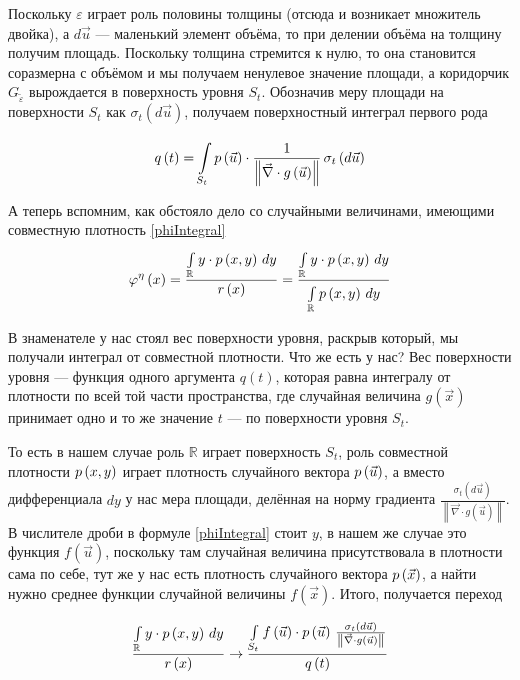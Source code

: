 Поскольку $\varepsilon$ играет роль половины толщины
(отсюда и возникает множитель двойка),
а $d\vec{u}$ --- маленький элемент объёма,
то при делении объёма на толщину получим площадь.
Поскольку толщина стремится к нулю,
то она становится соразмерна с объёмом и мы получаем ненулевое значение площади,
а коридорчик $G_{\tilde{\varepsilon}}$ вырождается в поверхность уровня $S_t$.
Обозначив меру площади на поверхности $S_t$ как
$\sigma_{t}\left( d\vec{u} \right)$,
получаем поверхностный интеграл первого рода

\begin{equation}\label{formula:conditionDencity}
  q\left( t \right)
  = \integrall{S_t}{\sigma_{t}\left(d\vec{u} \right)}{
      \pdf{\vec{u}} \cdot \frac{1}
      {\left\| \vec{\nabla} \cdot g\left( \vec{u} \right) \right\|}}
\end{equation}

А теперь вспомним, как обстояло дело со случайными величинами,
имеющими совместную плотность \eqref{phiIntegral}
$$\varphi^{\eta}\left( x \right)
  = \frac{\integral{\mathbb{R}}{}{y}{y \cdot \pdf{x,y}}}
      {r\left( x \right)}
  = \frac{\integral{\mathbb{R}}{}{y}{y \cdot \pdf{x,y}}}
      {\integral{\mathbb{R}}{}{y}{\pdf{x,y}}}$$

В знаменателе у нас стоял вес поверхности уровня,
раскрыв который, мы получали интеграл от совместной плотности.
Что же есть у нас?
Вес поверхности уровня --- функция одного аргумента $q\left( t \right)$,
которая равна интегралу от плотности по всей той части пространства,
где случайная величина $g\left( \vec{x} \right)$
принимает одно и то же значение $t$ --- по поверхности уровня $S_t$.

То есть в нашем случае роль $\mathbb{R}$ играет поверхность $S_t$,
роль совместной плотности $\pdf{x,y}$ играет плотность случайного вектора
$\pdf{\vec{u}}$, а вместо дифференциала $dy$ у нас мера площади,
делённая на норму градиента $\frac{\sigma_{t}\left( d\vec{u} \right)}
{\left\| \vec{\nabla} \cdot g\left( \vec{u} \right) \right\|}$.
В числителе дроби в формуле \eqref{phiIntegral} стоит $y$,
в нашем же случае это функция $f\left( \vec{u} \right)$,
поскольку там случайная величина присутствовала в плотности сама по себе,
тут же у нас есть плотность случайного вектора $\pdf{\vec{x}}$,
а найти нужно среднее функции случайной величины $f\left( \vec{x} \right)$.
Итого, получается переход

$$\frac{\integral{\mathbb{R}}{}{y}{y \cdot \pdf{x,y}}}{r\left( x \right)}
  \rightarrow
      \frac{\integrall{S_t}{\frac{\sigma_{t}\left( d\vec{u} \right)}{
      \left\| \vec{\nabla} \cdot g\left( \vec{u} \right) \right\|}}{
      f\left( \vec{u} \right) \cdot \pdf{\vec{u}}}}{q\left( t \right)}$$

